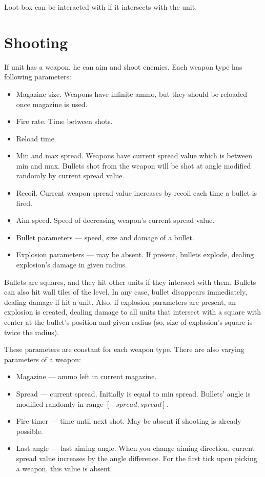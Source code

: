 Loot box can be interacted with if it intersects with the unit.

\section{Shooting}

If unit has a weapon, he can aim and shoot enemies. Each weapon type has following parameters:
\begin{itemize}
      \item Magazine size. Weapons have infinite ammo, but they should be reloaded once magazine is used.
      \item Fire rate. Time between shots.
      \item Reload time.
      \item Min and max spread. Weapons have current spread value which is between min and max.
            Bullets shot from the weapon will be shot at angle modified randomly by current spread value.
      \item Recoil. Current weapon spread value increases by recoil each time a bullet is fired.
      \item Aim speed. Speed of decreasing weapon's current spread value.
      \item Bullet parameters --- speed, size and damage of a bullet.
      \item Explosion parameters --- may be absent.
            If present, bullets explode, dealing explosion's damage in given radius.
\end{itemize}

Bullets are squares, and they hit other units if they intersect with them.
Bullets can also hit wall tiles of the level.
In any case, bullet disappears immediately, dealing damage if hit a unit.
Also, if explosion parameters are present, an explosion is created,
dealing damage to all units that intersect with a square with center at the bullet's position and given radius
(so, size of explosion's square is twice the radius).

These parameters are constant for each weapon type. There are also varying parameters of a weapon:
\begin{itemize}
      \item Magazine --- ammo left in current magazine.
      \item Spread --- current spread. Initially is equal to min spread.
            Bullets' angle is modified randomly in range $[-spread, spread]$.
      \item Fire timer --- time until next shot. May be absent if shooting is already possible.
      \item Last angle --- last aiming angle. When you change aiming direction,
            current spread value increases by the angle difference.
            For the first tick upon picking a weapon, this value is absent.
\end{itemize}

